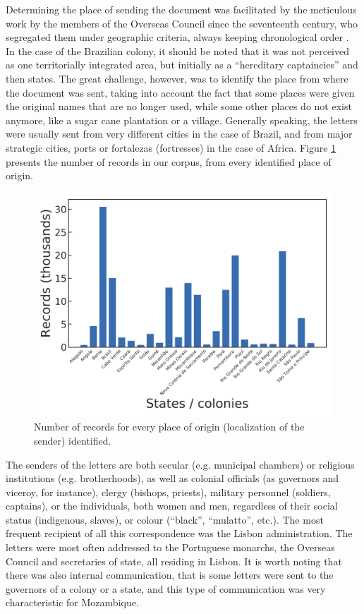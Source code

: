 \documentclass{article}
\begin{document}
Determining the place of sending the document was facilitated by the meticulous work by the members of the Overseas Council since the seventeenth century, who segregated them under geographic criteria, always keeping chronological order \cite{arquivo_historico_colonial_boletim_1950}. In the case of the Brazilian colony, it should be noted that it was not perceived as one territorially integrated area, but initially as a “hereditary captaincies” and then states. The great challenge, however, was to identify the place from where the document was sent, taking into account the fact that some places were given the original names that are no longer used, while some other places do not exist anymore, like a sugar cane plantation or a village. Generally speaking, the letters were usually sent from very different cities in the case of Brazil, and from major strategic cities, ports or fortalezas (fortresses) in the case of Africa. Figure \ref{fig:records_state} presents the number of records in our corpus, from every identified place of origin.

\begin{figure}
	\centering
	\includegraphics[scale=0.40]{records_per_state.png}
	\caption{Number of records for every place of origin (localization of the sender) identified.}
	\label{fig:records_state}
\end{figure}

The senders of the letters are both secular (e.g. municipal chambers) or religious institutions (e.g. brotherhoods), as well as colonial officials (as governors and viceroy, for instance), clergy (bishops, priests), military personnel (soldiers, captains), or the individuals,  both women and men, regardless of their social status (indigenous, slaves), or colour (“black”, “mulatto”, etc.). The most frequent recipient of all this correspondence was the Lisbon administration. The letters were most often addressed to the Portuguese monarchs, the Overseas Council and secretaries of state, all residing in Lisbon. It is worth noting that there was also internal communication, that is some letters were sent to the governors of a colony or a state, and this type of communication was very characteristic for Mozambique.
\end{document}
